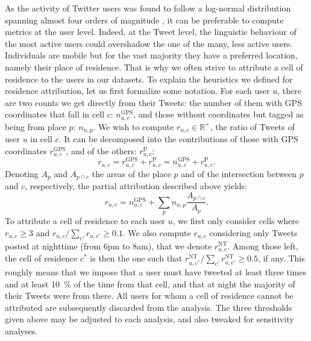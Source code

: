 \documentclass[../thesis.tex]{subfiles}
\begin{document}
As the activity of Twitter users was found to follow a log-normal distribution spanning
almost four orders of magnitude \cite{MocanuTwitterBabel2013}, it can be preferable to
compute metrics at the user level. Indeed, at the Tweet level, the linguistic behaviour
of the most active users could overshadow the one of the many, less active users.
Individuals are mobile but for the vast majority they have a preferred location, namely
their place of residence. That is why we often strive to attribute a cell of residence
to the users in our datasets. To explain the heuristics we defined for residence
attribution, let us first formalize some notation. For each user $u$, there are two
counts we get directly from their Tweets: the number of them with GPS coordinates that
fall in cell $c$: $n_{u, c}^{\text{GPS}}$, and those without coordinates but tagged as
being from place $p$: $n_{u, p}$.  We wish to compute $r_{u, c} \in \mathbb{R}^+$, the
ratio of Tweets of user $u$ in cell $c$. It can be decomposed into the contributions of
those with GPS coordinates $r_{u, c}^{\text{GPS}}$, and of the others: $r_{u,
c}^{\text{P}}$:
\begin{equation}
  r_{u, c}
    = r_{u, c}^{\text{GPS}} + r_{u, c}^{\text{P}}
    = n_{u, c}^{\text{GPS}} + r_{u, c}^{\text{P}}.
\end{equation}
Denoting $A_p$ and $A_{p \cap c}$ the areas of the place $p$ and of the intersection
between $p$ and $c$, respectively, the partial attribution described above yields:
\begin{equation}
  r_{u, c} = n_{u, c}^{\text{GPS}} + \sum_p n_{u, p} \frac{A_{p \cap c}}{A_p}.
\end{equation}
To attribute a cell of residence to each user $u$, we first only consider cells where
$r_{u, c} \geq 3$ and $r_{u, c} / \sum_{c'} r_{u, c'} \geq 0.1$. We also compute
$r_{u,c}$ considering only Tweets posted at nighttime (from 6pm to 8am), that we denote
$r_{u, c}^\text{NT}$. Among those left, the cell of residence $c^*$ is then the one such
that $r_{u, c^*}^\text{NT} / \sum_{c'} r_{u, c'}^\text{NT} \geq 0.5$, if any. This
roughly means that we impose that a user must have tweeted at least three times and at
least \SI{10}{\percent} of the time from that cell, and that at night the majority of
their Tweets were from there. All users for whom a cell of residence cannot be
attributed are subsequently discarded from the analysis. The three thresholds given
above may be adjusted to each analysis, and also tweaked for sensitivity analyses.  
\end{document}
